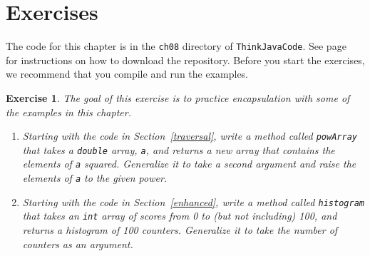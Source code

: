 \documentclass[12pt]{book}
\theoremstyle{exercise}
\newtheorem{exercise}{Exercise}[chapter]
\newcommand{\java}[1]{\verb"#1"}
\begin{document}
\section{Exercises}

The code for this chapter is in the {\tt ch08} directory of {\tt ThinkJavaCode}.
See page~\pageref{code} for instructions on how to download the repository.
Before you start the exercises, we recommend that you compile and run the examples.

\begin{exercise}
The goal of this exercise is to practice encapsulation with some of the examples in this chapter.

\begin{enumerate}

\item Starting with the code in Section~\ref{traversal}, write a method called \java{powArray} that takes a \java{double} array, \java{a}, and returns a new array that contains the elements of \java{a} squared.
Generalize it to take a second argument and raise the elements of \java{a} to the given power.

\item Starting with the code in Section~\ref{enhanced}, write a method called \java{histogram} that takes an \java{int} array of scores from 0 to (but not including) 100, and returns a histogram of 100 counters.
Generalize it to take the number of counters as an argument.

\end{enumerate}

\end{exercise}
\end{document}
